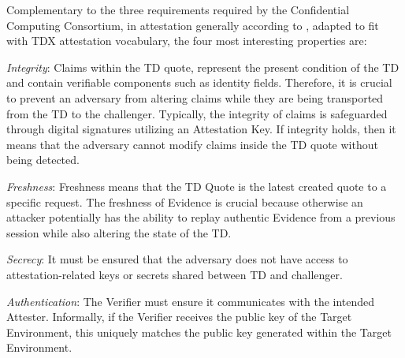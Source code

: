 Complementary to the three requirements required by the Confidential Computing Consortium, in attestation generally according to \cite{sardar_demystifying_2021}, adapted to fit with TDX attestation vocabulary, the four most interesting properties are:

\label{FourProperties}
\textit{Integrity}: Claims within the TD quote, represent the present condition of the TD and contain verifiable components such as identity fields. Therefore, it is crucial to prevent an adversary from altering claims while they are being transported from the TD to the challenger. Typically, the integrity of claims is safeguarded through digital signatures utilizing an Attestation Key. If integrity holds, then it means that the adversary cannot modify claims inside the TD quote without being detected.

\textit{Freshness}: Freshness means that the TD Quote is the latest created quote to a specific request. The freshness of Evidence is crucial because otherwise an attacker potentially has the ability to replay authentic Evidence from a previous session while also altering the state of the TD.

\textit{Secrecy}: It must be ensured that the adversary does not have access to attestation-related keys or secrets shared between TD and challenger.

\textit{Authentication}: The Verifier must ensure it communicates with the intended Attester. Informally, if the Verifier receives the public key of the Target Environment, this uniquely matches the public key generated within the Target Environment.

